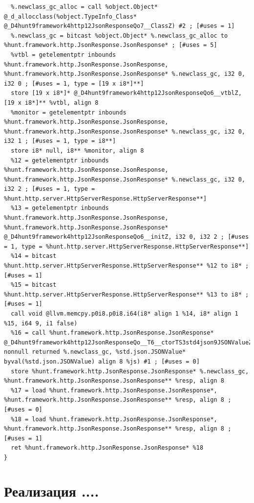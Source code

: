 \documentclass{studrep}
\begin{document}
\begin{verbatim}
  %.newclass_gc_alloc = call %object.Object* @_d_allocclass(%object.TypeInfo_Class* @_D4hunt9framework4http12JsonResponseQo7__ClassZ) #2 ; [#uses = 1]
  %.newclass_gc = bitcast %object.Object* %.newclass_gc_alloc to %hunt.framework.http.JsonResponse.JsonResponse* ; [#uses = 5]
  %vtbl = getelementptr inbounds %hunt.framework.http.JsonResponse.JsonResponse, %hunt.framework.http.JsonResponse.JsonResponse* %.newclass_gc, i32 0, i32 0 ; [#uses = 1, type = [19 x i8*]**]
  store [19 x i8*]* @_D4hunt9framework4http12JsonResponseQo6__vtblZ, [19 x i8*]** %vtbl, align 8
  %monitor = getelementptr inbounds %hunt.framework.http.JsonResponse.JsonResponse, %hunt.framework.http.JsonResponse.JsonResponse* %.newclass_gc, i32 0, i32 1 ; [#uses = 1, type = i8**]
  store i8* null, i8** %monitor, align 8
  %12 = getelementptr inbounds %hunt.framework.http.JsonResponse.JsonResponse, %hunt.framework.http.JsonResponse.JsonResponse* %.newclass_gc, i32 0, i32 2 ; [#uses = 1, type = %hunt.http.server.HttpServerResponse.HttpServerResponse**]
  %13 = getelementptr inbounds %hunt.framework.http.JsonResponse.JsonResponse, %hunt.framework.http.JsonResponse.JsonResponse* @_D4hunt9framework4http12JsonResponseQo6__initZ, i32 0, i32 2 ; [#uses = 1, type = %hunt.http.server.HttpServerResponse.HttpServerResponse**]
  %14 = bitcast %hunt.http.server.HttpServerResponse.HttpServerResponse** %12 to i8* ; [#uses = 1]
  %15 = bitcast %hunt.http.server.HttpServerResponse.HttpServerResponse** %13 to i8* ; [#uses = 1]
  call void @llvm.memcpy.p0i8.p0i8.i64(i8* align 1 %14, i8* align 1 %15, i64 9, i1 false)
  %16 = call %hunt.framework.http.JsonResponse.JsonResponse* @_D4hunt9framework4http12JsonResponseQo__T6__ctorTS3std4json9JSONValueZQBdMFQBaZCQDaQCyQCrQCpQCs(%hunt.framework.http.JsonResponse.JsonResponse* nonnull returned %.newclass_gc, %std.json.JSONValue* byval(%std.json.JSONValue) align 8 %js) #1 ; [#uses = 0]
  store %hunt.framework.http.JsonResponse.JsonResponse* %.newclass_gc, %hunt.framework.http.JsonResponse.JsonResponse** %resp, align 8
  %17 = load %hunt.framework.http.JsonResponse.JsonResponse*, %hunt.framework.http.JsonResponse.JsonResponse** %resp, align 8 ; [#uses = 0]
  %18 = load %hunt.framework.http.JsonResponse.JsonResponse*, %hunt.framework.http.JsonResponse.JsonResponse** %resp, align 8 ; [#uses = 1]
  ret %hunt.framework.http.JsonResponse.JsonResponse* %18
}
\end{verbatim}


\chapter{Реализация ....}
\end{document}
